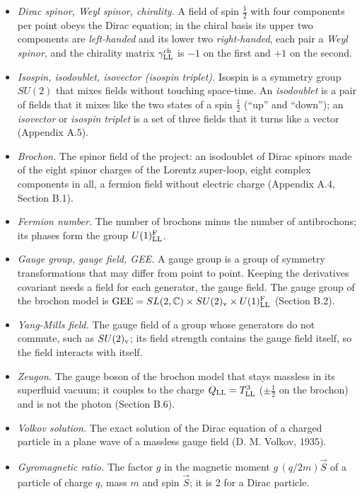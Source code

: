 \documentclass[
  10pt,
]{article}
\providecommand{\tightlist}{%
  \setlength{\itemsep}{0pt}\setlength{\parskip}{0pt}}
\begin{document}
\begin{itemize}
\tightlist
\item
  \emph{Dirac spinor, Weyl spinor, chirality.} A field of spin
  \(\tfrac12\) with four components per point obeys the Dirac equation;
  in the chiral basis its upper two components are \emph{left-handed}
  and its lower two \emph{right-handed}, each pair a \emph{Weyl spinor},
  and the chirality matrix \(\gamma^{\rm ch}_{\rm LL}\) is \(-1\) on the
  first and \(+1\) on the second.
\item
  \emph{Isospin, isodoublet, isovector (isospin triplet).} Isospin is a
  symmetry group \(SU(2)\) that mixes fields without touching
  space-time. An \emph{isodoublet} is a pair of fields that it mixes
  like the two states of a spin \(\tfrac12\) (``up'' and ``down''); an
  \emph{isovector} or \emph{isospin triplet} is a set of three fields
  that it turns like a vector (Appendix A.5).
\item
  \emph{Brochon.} The spinor field of the project: an isodoublet of
  Dirac spinors made of the eight spinor charges of the Lorentz
  super-loop, eight complex components in all, a fermion field without
  electric charge (Appendix A.4, Section B.1).
\item
  \emph{Fermion number.} The number of brochons minus the number of
  antibrochons; its phases form the group \(U(1)^{\rm F}_{\rm LL}\).
\item
  \emph{Gauge group, gauge field, GEE.} A gauge group is a group of
  symmetry transformations that may differ from point to point. Keeping
  the derivatives covariant needs a field for each generator, the gauge
  field. The gauge group of the brochon model is
  \(\mathrm{GEE}=SL(2,\mathbb C)\times SU(2)_{\rm v}\times U(1)^{\rm F}_{\rm LL}\)
  (Section B.2).
\item
  \emph{Yang-Mills field.} The gauge field of a group whose generators
  do not commute, such as \(SU(2)_{\rm v}\); its field strength contains
  the gauge field itself, so the field interacts with itself.
\item
  \emph{Zeugon.} The gauge boson of the brochon model that stays
  massless in its superfluid vacuum; it couples to the charge
  \(Q_{\rm LL}=T^3_{\rm LL}\) (\(\pm\tfrac12\) on the brochon) and is
  not the photon (Section B.6).
\item
  \emph{Volkov solution.} The exact solution of the Dirac equation of a
  charged particle in a plane wave of a massless gauge field (D. M.
  Volkov, 1935).
\item
  \emph{Gyromagnetic ratio.} The factor \(g\) in the magnetic moment
  \(g\,(q/2m)\vec S\) of a particle of charge \(q\), mass \(m\) and spin
  \(\vec S\); it is 2 for a Dirac particle.
\end{itemize}
\end{document}
